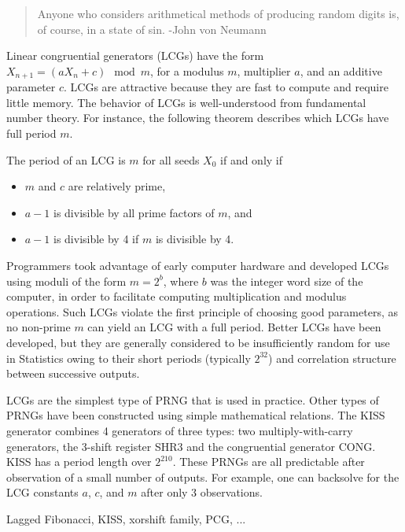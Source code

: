 \documentclass[graybox]{svmult}
\newcommand{\todo}[1]{{\color{red}{TO DO: \sc #1}}}
\begin{document}
\begin{quotation}
Anyone who considers arithmetical methods of producing random digits is, of course, in a state of sin.  -John von Neumann
\end{quotation}


Linear congruential generators (LCGs) have the form $X_{n+1} = (a X_n + c) \mod m$, for a modulus $m$, 
multiplier $a$, and an additive parameter $c$.
LCGs are attractive because they are fast to compute and require little memory.
The behavior of LCGs is well-understood from fundamental number theory.
For instance, the following theorem describes which LCGs have full period $m$.

\begin{theorem}
\label{thm:hull_dobell_period}
The period of an LCG is $m$ for all seeds $X_0$ if and only if
\begin{itemize}
\item $m$ and $c$ are relatively prime,
\item $a-1$ is divisible by all prime factors of $m$, and
\item $a-1$ is divisible by 4 if $m$ is divisible by 4.
\end{itemize}
\end{theorem}

Programmers took advantage of early computer hardware and developed LCGs using moduli of the form $m = 2^b$, where
$b$ was the integer word size of the computer, in order to facilitate computing multiplication and modulus operations.
Such LCGs violate the first principle of choosing good parameters, as no non-prime $m$ can yield an LCG with a full period.
Better LCGs have been developed, but they are generally considered to be insufficiently random for use in Statistics owing to their short periods (typically $2^{32}$) and correlation structure between successive outputs.

LCGs are the simplest type of PRNG that is used in practice.
Other types of PRNGs have been constructed using simple mathematical relations.
The KISS generator combines 4 generators of three types: two multiply-with-carry
generators, the 3-shift register SHR3 and the congruential generator CONG.
KISS has a period length over $2^{210}$.
\todo{Mention lagged fibonacci sequences, xorshift}
These PRNGs are all predictable after observation of a small number of outputs.
For example, one can backsolve for the LCG constants $a$, $c$, and $m$ after only 3 observations.


Lagged Fibonacci, KISS, xorshift family, PCG, ... 
\end{document}
